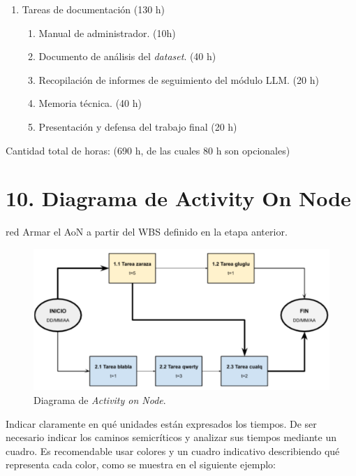 \documentclass[
11pt, %
]{Clases/charter}
\begin{document}
\begin{enumerate}
\begin{enumerate}
	      \end{enumerate}
	\item Tareas de documentación (130 h)
	      \begin{enumerate}
		      \item Manual de administrador. (10h)
		      \item Documento de análisis del \textit{dataset}. (40 h)
		      \item Recopilación de informes de seguimiento del módulo LLM. (20 h)
		      \item Memoria técnica. (40 h)
		      \item Presentación y defensa del trabajo final (20 h)
	      \end{enumerate}
\end{enumerate}

Cantidad total de horas: (690 h, de las cuales 80 h son opcionales)
\section{10. Diagrama de Activity On Node}
\label{sec:AoN}

\begin{consigna}{red}
	Armar el AoN a partir del WBS definido en la etapa anterior.



\end{consigna}

\begin{figure}[htpb]
	\centering
	\includegraphics[width=.8\textwidth]{./Figuras/AoN.png}
	\caption{Diagrama de \textit{Activity on Node}.}
	\label{fig:AoN}
\end{figure}

Indicar claramente en qué unidades están expresados los tiempos.
De ser necesario indicar los caminos semicríticos y analizar sus tiempos mediante un cuadro.
Es recomendable usar colores y un cuadro indicativo describiendo qué representa cada color, como se muestra en el siguiente ejemplo:
\end{document}
